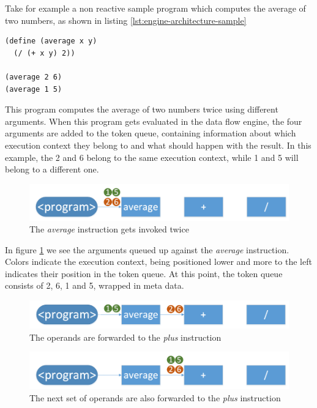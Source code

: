 Take for example a non reactive sample program which computes the average of two numbers, as shown in listing \ref{lst:engine-architecture-sample}

\begin{lstlisting}[caption={Computing the average of two numbers},captionpos=b,label={lst:engine-architecture-sample},language=FrDataFlow]
(define (average x y)
  (/ (+ x y) 2))
  
(average 2 6)
(average 1 5)
\end{lstlisting}

This program computes the average of two numbers twice using different arguments. When this program gets evaluated in the data flow engine, the four arguments are added to the token queue, containing information about which execution context they belong to and what should happen with the result. 
In this example, the 2 and 6 belong to the same execution context, while 1 and 5 will belong to a different one. 

\begin{figure}[h!]
	\includegraphics[width=\textwidth]{images/Engine-Architecture-1.png}
	\caption{The \textit{average} instruction gets invoked twice}
	\label{fig:engine-architecture-1}
\end{figure}

In figure \ref{fig:engine-architecture-1} we see the arguments queued up against the \textit{average} instruction. Colors indicate the execution context, being positioned lower and more to the left indicates their position in the token queue. At this point, the token queue consists of 2, 6, 1 and 5, wrapped in meta data. 

\begin{figure}[h!]
	\includegraphics[width=\textwidth]{images/Engine-Architecture-2.png}
	\caption{The operands are forwarded to the \textit{plus} instruction}
	\label{fig:engine-architecture-2}
\end{figure}

\begin{figure}[h!]
	\includegraphics[width=\textwidth]{images/Engine-Architecture-3.png}
	\caption{The next set of operands are also forwarded to the \textit{plus} instruction}
	\label{fig:engine-architecture-3}
\end{figure}

